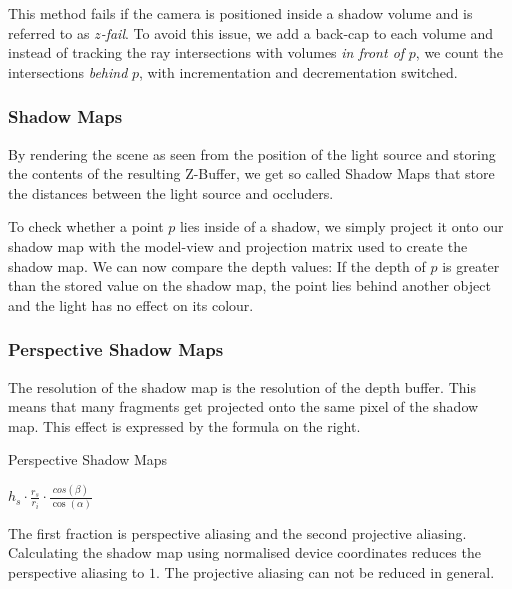 \documentclass[english]{panikzettel}
\begin{document}
This method fails if the camera is positioned inside a shadow volume and is referred to as \emph{$z$-fail}. To avoid this issue, we add a back-cap to each volume and instead of tracking the ray intersections with volumes \emph{in front of} $p$, we count the intersections \emph{behind} $p$, with incrementation and decrementation switched.

\subsubsection*{Shadow Maps}
By rendering the scene as seen from the position of the light source and storing the contents of the resulting Z-Buffer, we get so called Shadow Maps that store the distances between the light source and occluders.

To check whether a point $p$ lies inside of a shadow, we simply project it onto our shadow map with the model-view and projection matrix used to create the shadow map. We can now compare the depth values: If the depth of $p$ is greater than the stored value on the shadow map, the point lies behind another object and the light has no effect on its colour.

\subsubsection*{Perspective Shadow Maps}
\label{subsubsec::perspectiveShadowMaps}

\begin{halfboxl}
The resolution of the shadow map is the resolution of the depth buffer. This means that many fragments get projected onto the same pixel of the shadow map.
This effect is expressed by the formula on the right.
\end{halfboxl}
\begin{halfboxr}
\vspace{-\baselineskip}
\begin{defi}{Perspective Shadow Maps}
\begin{center}
    $h_s \cdot \frac{r_s}{r_i} \cdot \frac{cos(\beta)}{\cos(\alpha)}$
\end{center}
\end{defi}
\end{halfboxr}

The first fraction is perspective aliasing and the second projective aliasing. Calculating the shadow map using normalised device coordinates reduces the perspective aliasing to $1$. The projective aliasing can not be reduced in general.
\end{document}
